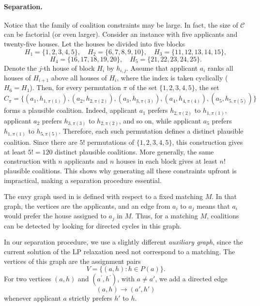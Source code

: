 \documentclass[12pt]{report}
\numberwithin{algorithm}{chapter}
\begin{document}
	\paragraph{Separation.} Notice that the family of coalition constraints may be large. In fact, the size of $\mathcal C$ can be factorial (or even larger). 
	Consider an instance with five applicants and twenty-five houses. Let the houses be divided into five blocks
	\[
	H_1=\{1,2,3,4,5\},\quad
	H_2=\{6,7,8,9,10\},\quad
	H_3=\{11,12,13,14,15\},
	\]
	\[
	H_4=\{16,17,18,19,20\},\quad
	H_5=\{21,22,23,24,25\}.
	\]
	Denote the $j$-th house of block $H_i$ by $h_{i,j}$. Assume that applicant $a_i$ ranks all houses of $H_{i+1}$ above all houses of $H_i$, where the index is taken cyclically ($H_6=H_1$). Then, for every permutation $\pi$ of the set $\{1,2,3,4,5\}$, the set
	\[
	C_\pi=
	\{(a_1,h_{1,\pi(1)}),(a_2,h_{2,\pi(2)}),(a_3,h_{3,\pi(3)}),
	(a_4,h_{4,\pi(4)}),(a_5,h_{5,\pi(5)})\}
	\]
	forms a plausible coalition. Indeed, applicant $a_1$ prefers $h_{2,\pi(2)}$ to $h_{1,\pi(1)}$, applicant $a_2$ prefers $h_{3,\pi(3)}$ to $h_{2,\pi(2)}$, and so on, while applicant $a_5$ prefers $h_{1,\pi(1)}$ to $h_{5,\pi(5)}$. Therefore, each such permutation defines a distinct plausible coalition. Since there are $5!$ permutations of \(\{1,2,3,4,5\}\), this construction gives at least
	$5! = 120$ distinct plausible coalitions. More generally, the same construction with $n$ applicants and $n$ houses in each block gives at least $n!$ plausible coalitions. This shows why generating all these constraints upfront is impractical, making a separation procedure essential. 
	
	The envy graph used in {\cite[Chapter 2, p. 6]{abraham2004pareto}} is defined with respect to a fixed matching $M$. In that graph, the vertices are the applicants, and an edge from $a_i$ to $a_j$ means that $a_i$ would prefer the house assigned to $a_j$ in $M$. Thus, for a matching $M$, coalitions can be detected by looking for directed cycles in this graph.
	
	In our separation procedure, we use a slightly different \emph{auxiliary graph}, since the current solution of the LP relaxation need not correspond to a matching. The vertices of this graph are the assignment pairs
	\[
	V=\{(a,h): h\in P(a)\}.
	\]
	For two vertices $(a,h)$ and $(a^{'},h^{'})$, with $a\neq a'$, we add a directed edge
	\[
	(a,h)\longrightarrow (a',h')
	\]
	whenever applicant $a$ strictly prefers $h'$ to $h$. 
	
\end{document}
